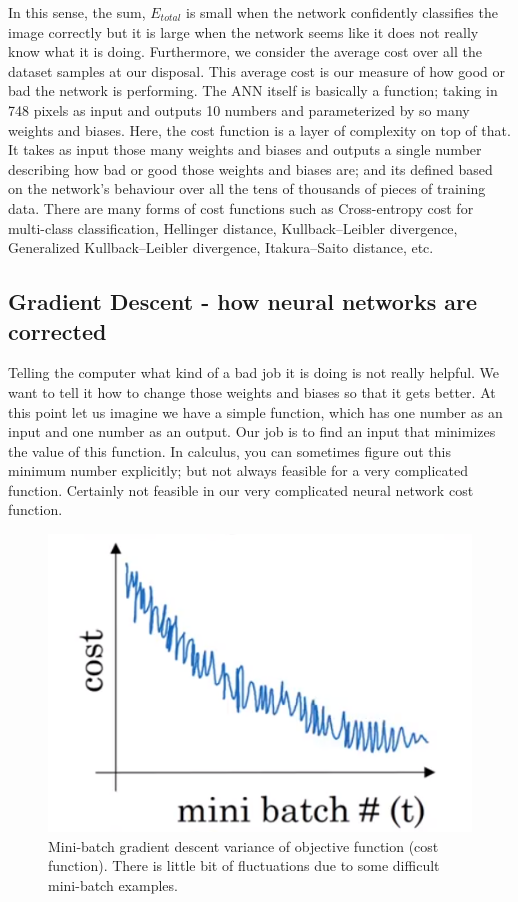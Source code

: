 \documentclass[master]{thesis-uestc}
\begin{document}
In this sense, the sum, $E_{total}$ is small when the network confidently classifies the image correctly but it is large when the network seems like it does not really know what it is doing. Furthermore, we consider the average cost over all the dataset samples at our disposal. This average cost is our measure of how good or bad the network is performing. The ANN itself is basically a function; taking in 748 pixels as input and outputs 10 numbers and parameterized by so many weights and biases. Here, the cost function is a layer of complexity on top of that. It takes as input those many weights and biases and outputs a single number describing how bad or good those weights and biases are; and its defined based on the network's behaviour over all the tens of thousands of pieces of training data. There are many forms of cost functions such as Cross-entropy cost\cite{deBoer2005} for multi-class classification, Hellinger distance\cite{Nikulin2018}, Kullback–Leibler divergence\cite{kullback1951}, Generalized Kullback–Leibler divergence\cite{4655451}, Itakura–Saito distance\cite{NOZAKI201763}, etc.

\subsection{Gradient Descent - how neural networks are corrected}
Telling the computer what kind of a bad job it is doing is not really helpful. We want to tell it how to change those weights and biases so that it gets better. At this point let us imagine we have a simple function, which has one number as an input and one number as an output. Our job is to find an input that minimizes the value of this function. In calculus, you can sometimes figure out this minimum number explicitly; but not always feasible for a very complicated function. Certainly not feasible in our very complicated neural network cost function. 

\begin{figure}[ht]
\includegraphics[width=5in]{pic/mini-batch.PNG}
\caption{Mini-batch gradient descent variance of objective function (cost function). There is little bit of fluctuations due to some difficult mini-batch examples.}
\label{mini-batch}
\end{figure}
\end{document}
